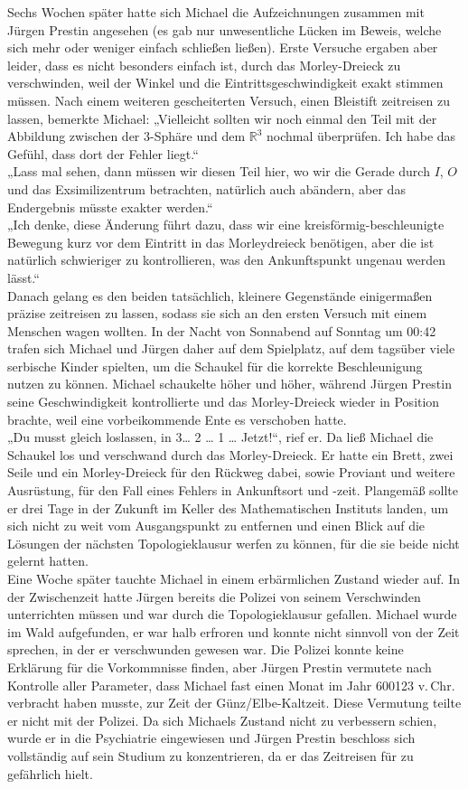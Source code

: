 \documentclass[oneside]{memoir}
\begin{document}
Sechs Wochen später hatte sich Michael die Aufzeichnungen zusammen mit Jürgen Prestin angesehen (es gab nur unwesentliche Lücken im Beweis, welche sich mehr oder weniger einfach schließen ließen). Erste Versuche ergaben aber leider, dass es nicht besonders einfach ist, durch das Morley-Dreieck zu verschwinden, weil der Winkel und die Eintrittsgeschwindigkeit exakt stimmen müssen. Nach einem weiteren gescheiterten Versuch, einen Bleistift zeitreisen zu lassen, bemerkte Michael: „Vielleicht sollten wir noch einmal den Teil mit der Abbildung zwischen der 3-Sphäre und dem $\mathbb{R}^3$ nochmal  überprüfen. Ich habe das Gefühl, dass dort der Fehler liegt.“ \\
„Lass mal sehen, dann müssen wir diesen Teil hier, wo wir die Gerade durch $I$, $O$ und das Exsimilizentrum betrachten, natürlich auch abändern, aber das Endergebnis müsste exakter werden.“ \\
„Ich denke, diese Änderung führt dazu, dass wir eine kreisförmig-beschleunigte Bewegung kurz vor dem Eintritt in das Morleydreieck benötigen, aber die ist natürlich schwieriger zu kontrollieren, was den Ankunftspunkt ungenau werden lässt.“ \\
Danach gelang es den beiden tatsächlich, kleinere Gegenstände einigermaßen präzise zeitreisen zu lassen, sodass sie sich an den ersten Versuch mit einem Menschen wagen wollten. In der Nacht von Sonnabend auf Sonntag um 00:42 trafen sich Michael und Jürgen daher auf dem Spielplatz, auf dem tagsüber viele serbische Kinder spielten, um die Schaukel für die korrekte Beschleunigung nutzen zu können. Michael schaukelte höher und höher, während Jürgen Prestin seine Geschwindigkeit kontrollierte und das Morley-Dreieck wieder in Position brachte, weil eine vorbeikommende Ente es verschoben hatte. \\
„Du musst gleich loslassen, in 3\ldots{} 2 \ldots{} 1 \ldots{} Jetzt!“, rief er. Da ließ Michael die Schaukel los und verschwand durch das Morley-Dreieck. Er hatte ein Brett, zwei Seile und ein Morley-Dreieck für den Rückweg dabei, sowie Proviant und weitere Ausrüstung, für den Fall eines Fehlers in Ankunftsort und -zeit. Plangemäß sollte er drei Tage in der Zukunft im Keller des Mathematischen Instituts landen, um sich nicht zu weit vom Ausgangspunkt zu entfernen und einen Blick auf die Lösungen der nächsten Topologieklausur werfen zu können, für die sie beide nicht gelernt hatten. \\
Eine Woche später tauchte Michael in einem erbärmlichen Zustand wieder auf. In der Zwischenzeit hatte Jürgen bereits die Polizei von seinem Verschwinden unterrichten müssen und war durch die Topologieklausur gefallen. Michael wurde im Wald aufgefunden, er war halb erfroren und konnte nicht sinnvoll von der Zeit sprechen, in der er verschwunden gewesen war. Die Polizei konnte keine Erklärung für die Vorkommnisse finden, aber Jürgen Prestin vermutete nach Kontrolle aller Parameter, dass Michael fast einen Monat im Jahr 600123 v.\,Chr. verbracht haben musste, zur Zeit der Günz/Elbe-Kaltzeit. Diese Vermutung teilte er nicht mit der Polizei. Da sich Michaels Zustand nicht zu verbessern schien, wurde er in die  Psychiatrie eingewiesen und Jürgen Prestin beschloss sich vollständig auf sein Studium zu konzentrieren, da er das Zeitreisen für zu gefährlich hielt.
 
\end{document}
